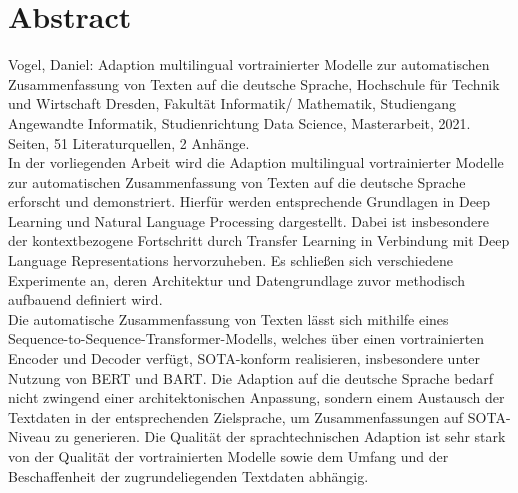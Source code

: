 \chapter*{Abstract}
\thispagestyle{empty}

\noindent
Vogel, Daniel: Adaption multilingual vortrainierter Modelle zur automatischen Zusammenfassung von Texten auf die deutsche Sprache, Hochschule für Technik und Wirtschaft Dresden, Fakultät Informatik/ Mathematik, Studiengang Angewandte Informatik, Studienrichtung Data Science, Masterarbeit, 2021.\\[1ex]

 Seiten, 51 Literaturquellen, 2 Anhänge.\\[30ex]

\noindent
In der vorliegenden Arbeit wird die Adaption multilingual vortrainierter Modelle zur automatischen Zusammenfassung von Texten auf die deutsche Sprache erforscht und demonstriert. Hierfür werden entsprechende Grundlagen in Deep Learning und Natural Language Processing dargestellt. Dabei ist insbesondere der kontextbezogene Fortschritt durch Transfer Learning in Verbindung mit Deep Language Representations hervorzuheben. Es schließen sich verschiedene Experimente an, deren Architektur und Datengrundlage zuvor methodisch aufbauend definiert wird.\\

\noindent
Die automatische Zusammenfassung von Texten lässt sich mithilfe eines Sequence-to-Sequence-Transformer-Modells, welches über einen vortrainierten Encoder und Decoder verfügt, SOTA-konform realisieren, insbesondere unter Nutzung von BERT und BART. Die Adaption auf die deutsche Sprache bedarf nicht zwingend einer architektonischen Anpassung, sondern einem Austausch der Textdaten in der entsprechenden Zielsprache, um Zusammenfassungen auf SOTA-Niveau zu generieren. Die Qualität der sprachtechnischen Adaption ist sehr stark von der Qualität der vortrainierten Modelle sowie dem Umfang und der Beschaffenheit der zugrundeliegenden Textdaten abhängig.
